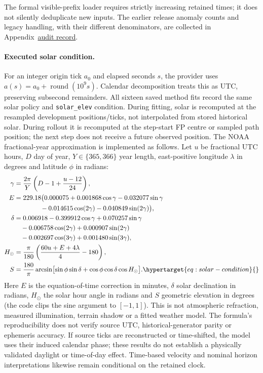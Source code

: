 The formal visible-prefix loader requires strictly increasing retained
times; it does not silently deduplicate new inputs. The earlier release
anomaly counts and legacy handling, with their different denominators, are
collected in Appendix~\href{audit-notes.pdf\#sec:source-reconciliation-details}{audit record}.

\paragraph{Executed solar condition.}
For an integer origin tick \(a_0\) and elapsed seconds \(s\), the provider uses
\(a(s)=a_0+\operatorname{round}(10^9s)\). Calendar decomposition treats this as
UTC, preserving subsecond remainders. All sixteen saved method fits record
the same solar policy and \texttt{solar\_elev} condition. During fitting,
solar is recomputed at the resampled development positions/ticks, not
interpolated from stored historical solar. During rollout it is recomputed
at the step-start FP centre or sampled path position; the next step does not
receive a future observed position. The NOAA fractional-year approximation
is implemented as follows\cite{noaa}. Let \(u\) be fractional UTC hours,
\(D\) day of year, \(Y\in\{365,366\}\) year length, east-positive longitude
\(\lambda\) in degrees and latitude \(\phi\) in radians:
\begin{align}
\gamma&=\frac{2\pi}{Y}\left(D-1+\frac{u-12}{24}\right),\nonumber\\
E&=229.18\bigl(0.000075+0.001868\cos\gamma-0.032077\sin\gamma\nonumber\\
 &\hspace{4em}-0.014615\cos(2\gamma)-0.040849\sin(2\gamma)\bigr),\nonumber\\
\delta&=0.006918-0.399912\cos\gamma+0.070257\sin\gamma\nonumber\\
 &\quad-0.006758\cos(2\gamma)+0.000907\sin(2\gamma)\nonumber\\
 &\quad-0.002697\cos(3\gamma)+0.001480\sin(3\gamma),\nonumber\\
H_\odot&=\frac{\pi}{180}\left(\frac{60u+E+4\lambda}{4}-180\right),\nonumber\\
S&=\frac{180}{\pi}\arcsin\bigl[\sin\phi\sin\delta+
          \cos\phi\cos\delta\cos H_\odot\bigr].
\label{eq:solar-condition}\hypertarget{eq:solar-condition}{}
\end{align}
Here \(E\) is the equation-of-time correction in minutes, \(\delta\) solar
declination in radians, \(H_\odot\) the solar hour angle in radians and
\(S\) geometric elevation in degrees (the code clips the sine argument to
\([-1,1]\)). This is not atmospheric refraction, measured illumination,
terrain shadow or a fitted weather model. The formula's reproducibility
does not verify source UTC, historical-generator parity or ephemeris
accuracy. If source ticks are reconstructed or time-shifted, the model uses
their induced calendar phase; these results do not establish a physically
validated daylight or time-of-day effect. Time-based velocity and nominal
horizon interpretations likewise remain conditional on the retained clock.

